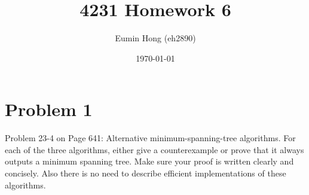 \documentclass{../../class}
\title{4231 Homework 6}
\author{Eumin Hong (eh2890)}
\date{\today}
\begin{document}
\maketitle



\section*{Problem 1}
\begin{tcolorbox}
    Problem 23-4 on Page 641: Alternative minimum-spanning-tree algorithms. For each of the three algorithms, either give a counterexample or prove that it always outputs a minimum spanning tree. Make sure your proof is written clearly and concisely. Also there is no need to describe efficient implementations of these algorithms.
\end{tcolorbox}
\end{document}
